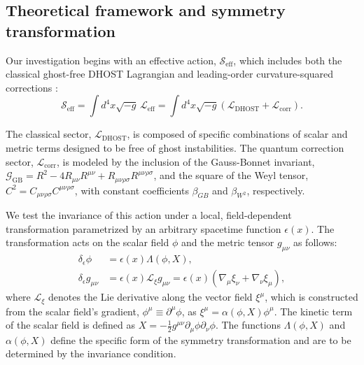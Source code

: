 \documentclass[twocolumn]{aastex631}
\begin{document}
\subsection{Theoretical framework and symmetry transformation}
Our investigation begins with an effective action, $\mathcal{S}_{\text{eff}}$, which includes both the classical ghost-free DHOST Lagrangian \citep{nezhad2025degeneratehigherorderscalartensortheories} and leading-order curvature-squared corrections \citep{lambiase2025exorcisingghostsgravitationalwaves}:
\begin{equation}
\mathcal{S}_{\text{eff}} = \int d^4x \sqrt{-g} \, \mathcal{L}_{\text{eff}} = \int d^4x \sqrt{-g} \left( \mathcal{L}_{\text{DHOST}} + \mathcal{L}_{\text{corr}} \right).
\end{equation}
\citep{kobayashi2024weakfieldregimescalartensortheories,takadera2025sphericalcollapsedhosttheories}

The classical sector, $\mathcal{L}_{\text{DHOST}}$, is composed of specific combinations of scalar and metric terms designed to be free of ghost instabilities. The quantum correction sector, $\mathcal{L}_{\text{corr}}$, is modeled by the inclusion of the Gauss-Bonnet invariant, $\mathcal{G}_{\text{GB}} = R^2 - 4R_{\mu\nu}R^{\mu\nu} + R_{\mu\nu\rho\sigma}R^{\mu\nu\rho\sigma}$, and the square of the Weyl tensor, $C^2 = C_{\mu\nu\rho\sigma}C^{\mu\nu\rho\sigma}$, with constant coefficients $\beta_{GB}$ and $\beta_{W^2}$, respectively. \citep{cheung2017positivitycurvaturesquaredcorrectionsgravity,sucu2025quantumcorrectedthermodynamicsconformalweyl}

We test the invariance of this action under a local, field-dependent transformation parametrized by an arbitrary spacetime function $\epsilon(x)$. The transformation acts on the scalar field $\phi$ and the metric tensor $g_{\mu\nu}$ as follows: \citep{jarv2015transformationpropertiesgeneralrelativity,babichev2024generalisationconformaldisformaltransformationsmetric}
\begin{align}
\delta_\epsilon \phi &= \epsilon(x) \Lambda(\phi, X), \\
\delta_\epsilon g_{\mu\nu} &= \epsilon(x) \mathcal{L}_{\xi} g_{\mu\nu} = \epsilon(x) (\nabla_\mu \xi_\nu + \nabla_\nu \xi_\mu), 
\end{align}
\citep{kupferman2023ellipticprecomplexeshodgelikedecompositions,popławski2024classicalphysicsspacetimefields}
where $\mathcal{L}_{\xi}$ denotes the Lie derivative along the vector field $\xi^\mu$, which is constructed from the scalar field's gradient, $\phi^\mu \equiv \partial^\mu\phi$, as $\xi^\mu = \alpha(\phi, X)\phi^\mu$. The kinetic term of the scalar field is defined as $X = -\frac{1}{2}g^{\mu\nu}\partial_\mu\phi\partial_\nu\phi$. The functions $\Lambda(\phi, X)$ and $\alpha(\phi, X)$ define the specific form of the symmetry transformation and are to be determined by the invariance condition.
\end{document}
